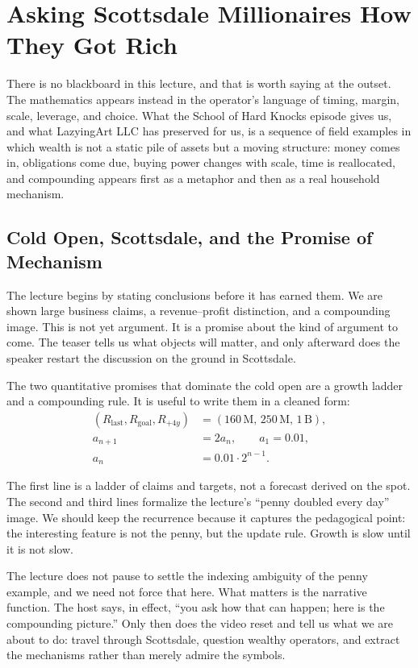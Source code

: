 \chapter{Asking Scottsdale Millionaires How They Got Rich}

There is no blackboard in this lecture, and that is worth saying at the outset. The mathematics appears instead in the operator's language of timing, margin, scale, leverage, and choice. What the School of Hard Knocks episode gives us, and what LazyingArt LLC has preserved for us, is a sequence of field examples in which wealth is not a static pile of assets but a moving structure: money comes in, obligations come due, buying power changes with scale, time is reallocated, and compounding appears first as a metaphor and then as a real household mechanism.

\section{Cold Open, Scottsdale, and the Promise of Mechanism}

The lecture begins by stating conclusions before it has earned them. We are shown large business claims, a revenue--profit distinction, and a compounding image. This is not yet argument. It is a promise about the kind of argument to come. The teaser tells us what objects will matter, and only afterward does the speaker restart the discussion on the ground in Scottsdale.

The two quantitative promises that dominate the cold open are a growth ladder and a compounding rule. It is useful to write them in a cleaned form:
\begin{align}
(R_{\text{last}},R_{\text{goal}},R_{+4y})
&=
(160\,\text{M},\,250\,\text{M},\,1\,\text{B}),\\
a_{n+1} &= 2a_n,\qquad a_1 = 0.01,\\
a_n &= 0.01 \cdot 2^{n-1}.
\end{align}

The first line is a ladder of claims and targets, not a forecast derived on the spot. The second and third lines formalize the lecture's ``penny doubled every day'' image. We should keep the recurrence because it captures the pedagogical point: the interesting feature is not the penny, but the update rule. Growth is slow until it is not slow.

The lecture does not pause to settle the indexing ambiguity of the penny example, and we need not force that here. What matters is the narrative function. The host says, in effect, ``you ask how that can happen; here is the compounding picture.'' Only then does the video reset and tell us what we are about to do: travel through Scottsdale, question wealthy operators, and extract the mechanisms rather than merely admire the symbols.


